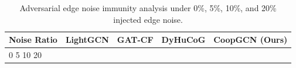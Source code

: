 \begin{table}[t]
\centering
\caption{Adversarial edge noise immunity analysis under 0\%, 5\%, 10\%, and 20\% injected edge noise.}
\label{tab:noise_immunity}
\begin{tabular}{lcccc}
\toprule
\textbf{Noise Ratio} & \textbf{LightGCN} & \textbf{GAT-CF} & \textbf{DyHuCoG} & \textbf{CoopGCN (Ours)} \\
\midrule
0%
5%
10%
20%
\bottomrule
\end{tabular}
\end{table}
